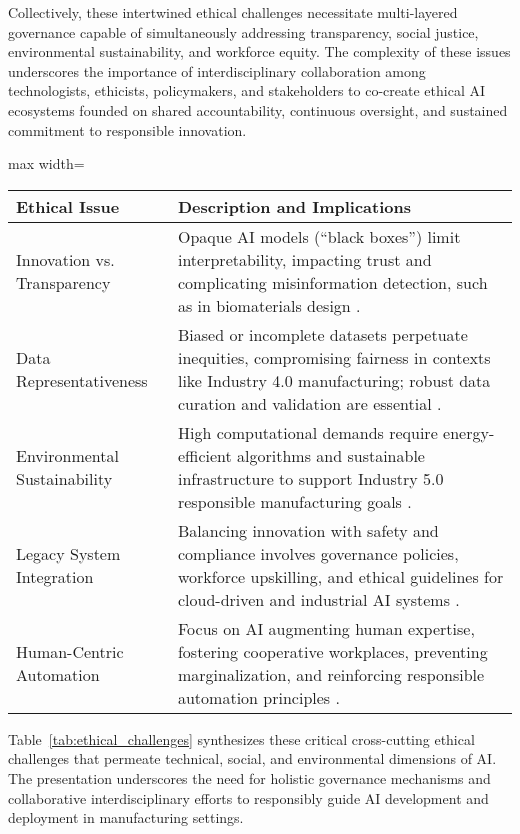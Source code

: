 \documentclass[sigconf]{acmart}
\begin{document}
Collectively, these intertwined ethical challenges necessitate multi-layered governance capable of simultaneously addressing transparency, social justice, environmental sustainability, and workforce equity. The complexity of these issues underscores the importance of interdisciplinary collaboration among technologists, ethicists, policymakers, and stakeholders to co-create ethical AI ecosystems founded on shared accountability, continuous oversight, and sustained commitment to responsible innovation.

\begin{table*}[htbp]
\centering
\caption{Summary of Key Cross-Cutting Ethical Challenges in AI Development and Deployment}
\label{tab:ethical_challenges}
\begin{adjustbox}{max width=\textwidth}
\begin{tabular}{@{}ll@{}}
\toprule
\textbf{Ethical Issue} & \textbf{Description and Implications} \\
\midrule
Innovation vs. Transparency & Opaque AI models (“black boxes”) limit interpretability, impacting trust and complicating misinformation detection, such as in biomaterials design \cite{ref7,ref8}. \\
\addlinespace
Data Representativeness & Biased or incomplete datasets perpetuate inequities, compromising fairness in contexts like Industry 4.0 manufacturing; robust data curation and validation are essential \cite{ref37,ref20,ref38}. \\
\addlinespace
Environmental Sustainability & High computational demands require energy-efficient algorithms and sustainable infrastructure to support Industry 5.0 responsible manufacturing goals \cite{ref19,ref6}. \\
\addlinespace
Legacy System Integration & Balancing innovation with safety and compliance involves governance policies, workforce upskilling, and ethical guidelines for cloud-driven and industrial AI systems \cite{ref11,ref12,ref38}. \\
\addlinespace
Human-Centric Automation & Focus on AI augmenting human expertise, fostering cooperative workplaces, preventing marginalization, and reinforcing responsible automation principles \cite{ref2}. \\
\bottomrule
\end{tabular}
\end{adjustbox}
\end{table*}

Table~\ref{tab:ethical_challenges} synthesizes these critical cross-cutting ethical challenges that permeate technical, social, and environmental dimensions of AI. The presentation underscores the need for holistic governance mechanisms and collaborative interdisciplinary efforts to responsibly guide AI development and deployment in manufacturing settings.
\end{document}
